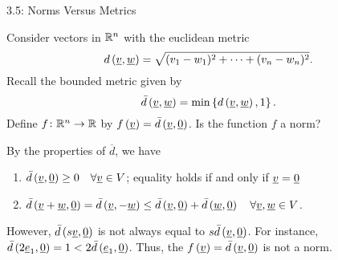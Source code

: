 \documentclass[10pt,english,aspectratio=169,handout]{beamer}
\begin{document}
\begin{frame}{3.5: Norms Versus Metrics}

\begin{example}
Consider vectors in $\mathbb{R}^n$ with the euclidean metric
\begin{equation*}
d \left( \underline{v}, \underline{w} \right)
= \sqrt{ (v_1 - w_1)^2 + \cdots + (v_n - w_n)^2 }.
\end{equation*}
Recall the bounded metric given by
\begin{equation*}
\bar{d} \left( \underline{v}, \underline{w} \right)
= \min \left\{ d \left( \underline{v}, \underline{w} \right), 1 \right\}.
\end{equation*}
\vspace{3mm}
Define $f \colon \mathbb{R}^n \rightarrow \mathbb{R}$ by
$f \left( \underline{v} \right) = \bar{d} \left( \underline{v}, \underline{0} \right)$.
Is the function $f$ a norm?

By the properties of $\overline{d}$, we have
\begin{enumerate}
\item $\bar{d} \left( \underline{v}, \underline{0} \right) \geq 0 \quad \forall \underline{v} \in V$; equality holds if and only if $\underline{v} = \underline{0}$
\item $\bar{d} \left( \underline{v} + \underline{w}, \underline{0}\right) = \bar{d} \left( \underline{v}, -\underline{w} \right) \leq \bar{d} \left( \underline{v}, \underline{0} \right) + \bar{d} \left( \underline{w}, \underline{0} \right) \quad \forall \underline{v}, \underline{w} \in V$.
\end{enumerate}

\vspace{2mm}

However, $\bar{d} \left( s \underline{v}, \underline{0} \right)$ is not always equal to $s \bar{d} \left( \underline{v}, \underline{0} \right)$.
For instance,
$\bar{d} \left( 2 \underline{e}_1, \underline{0} \right) = 1 < 2 \bar{d} \left( \underline{e}_1, \underline{0} \right)$.
Thus, the $f \left( \underline{v} \right) = \bar{d} \left( \underline{v}, \underline{0} \right)$
is not a norm.
\end{example}

\end{frame}
\end{document}
